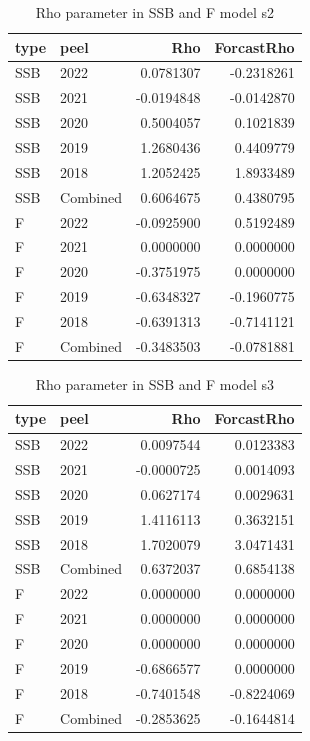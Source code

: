 \documentclass[
]{article}
\begin{document}
\begin{table}[H]

\caption{\label{tab:unnamed-chunk-14}\label{mod2}Rho parameter in SSB  and F model s2}
\centering
\begin{tabular}[t]{llrr}
\toprule
type & peel & Rho & ForcastRho\\
\midrule
SSB & 2022 & 0.0781307 & -0.2318261\\
SSB & 2021 & -0.0194848 & -0.0142870\\
SSB & 2020 & 0.5004057 & 0.1021839\\
SSB & 2019 & 1.2680436 & 0.4409779\\
SSB & 2018 & 1.2052425 & 1.8933489\\
\addlinespace
SSB & Combined & 0.6064675 & 0.4380795\\
F & 2022 & -0.0925900 & 0.5192489\\
F & 2021 & 0.0000000 & 0.0000000\\
F & 2020 & -0.3751975 & 0.0000000\\
F & 2019 & -0.6348327 & -0.1960775\\
\addlinespace
F & 2018 & -0.6391313 & -0.7141121\\
F & Combined & -0.3483503 & -0.0781881\\
\bottomrule
\end{tabular}
\end{table}

\begin{table}[H]

\caption{\label{tab:unnamed-chunk-14}\label{mod3}Rho parameter in SSB  and F model s3}
\centering
\begin{tabular}[t]{llrr}
\toprule
type & peel & Rho & ForcastRho\\
\midrule
SSB & 2022 & 0.0097544 & 0.0123383\\
SSB & 2021 & -0.0000725 & 0.0014093\\
SSB & 2020 & 0.0627174 & 0.0029631\\
SSB & 2019 & 1.4116113 & 0.3632151\\
SSB & 2018 & 1.7020079 & 3.0471431\\
\addlinespace
SSB & Combined & 0.6372037 & 0.6854138\\
F & 2022 & 0.0000000 & 0.0000000\\
F & 2021 & 0.0000000 & 0.0000000\\
F & 2020 & 0.0000000 & 0.0000000\\
F & 2019 & -0.6866577 & 0.0000000\\
\addlinespace
F & 2018 & -0.7401548 & -0.8224069\\
F & Combined & -0.2853625 & -0.1644814\\
\bottomrule
\end{tabular}
\end{table}
\end{document}
